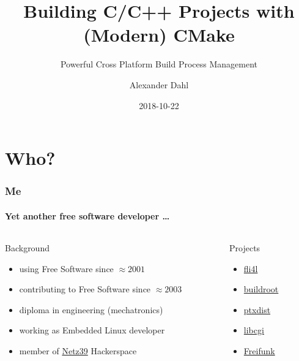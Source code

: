 \documentclass[t]{beamer}
\title[CMake]{Building C/C++ Projects with (Modern) CMake}
\subtitle{Powerful Cross Platform Build Process Management}
\author{Alexander Dahl}
\institute[lespocky.de]{\url{http://www.lespocky.de/}}
\date{2018-10-22}
\begin{document}
\begin{frame}
    \titlepage
\end{frame}



\section*{Who?}

\begin{frame}
    \frametitle{Me}
    \framesubtitle{Yet another free software developer \dots}

    \begin{columns}[T]
        \begin{column}{0.7\textwidth}
            \begin{block}{Background}
                \begin{itemize}
                    \item using Free Software since $\approx 2001$
                    \item contributing to Free Software since $\approx 2003$
                    \item diploma in engineering (mechatronics)
                    \item working as Embedded Linux developer
                    \item member of \href{http://www.netz39.de/}{Netz39}
                        Hackerspace
                \end{itemize}
            \end{block}
        \end{column}
        \pause
        \begin{column}{0.3\textwidth}
            \begin{block}{Projects}
                \begin{itemize}
                    \item \href{https://www.fli4l.de/}{fli4l}
                    \item \href{https://buildroot.org/}{buildroot}
                    \item \href{https://ptxdist.org/}{ptxdist}
                    \item \href{https://github.com/rafaelsteil/libcgi}{libcgi}
                    \item \href{https://freifunk.net/}{Freifunk}
                \end{itemize}
            \end{block}
        \end{column}
    \end{columns}
\end{frame}
\end{document}
